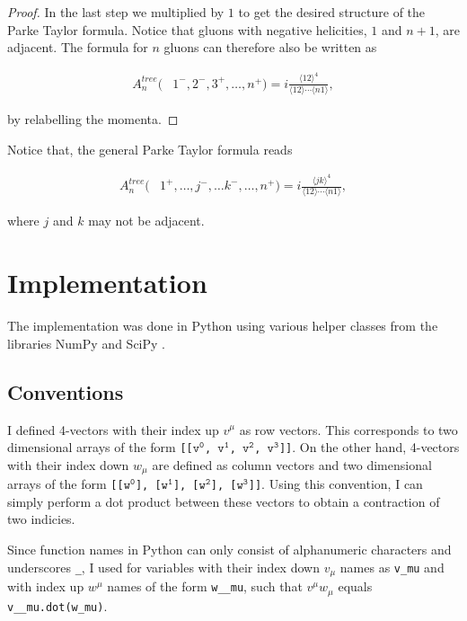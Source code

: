 \documentclass{article}
\theoremstyle{definition}
\def\code#1{\texttt{#1}}
\numberwithin{equation}{section}
\begin{document}
\begin{proof}
In the last step we multiplied by $1$ to get the desired structure of the Parke Taylor formula. Notice that gluons with negative helicities, $1$ and $n+1$, are adjacent. The formula for $n$ gluons can therefore also be written as

\begin{align}
    A_n^{tree}(&1^{-}, 2^{-}, 3^{+}, \dots , n^{+}) = i \frac{ \langle 12 \rangle^4 }{ \langle 12 \rangle \cdots \langle n1 \rangle },
\end{align}

by relabelling the momenta.

\end{proof}

Notice that, the general Parke Taylor formula reads

\begin{align}
    A_n^{tree}(&1^{+}, \dots, j^{-}, \dots k^{-}, \dots, n^{+}) = i \frac{ \langle jk \rangle^4 }{ \langle 12 \rangle \cdots \langle n1 \rangle },
\end{align}

where $j$ and $k$ may not be adjacent.  

\section{Implementation}

The implementation was done in Python using various helper classes from the libraries NumPy \cite{numpy} and SciPy \cite{scipy}.

\subsection{Conventions}

I defined 4-vectors with their index up $v^{\mu}$ as row vectors. This corresponds to two dimensional arrays of the form \code{[[$\code{v}^{\code{0}}$, $\code{v}^{\code{1}}$, $\code{v}^{\code{2}}$, $\code{v}^{\code{3}}$]]}. On the other hand, 4-vectors with their index down $w_{\mu}$ are defined as column vectors and two dimensional arrays of the form \code{[[$\code{w}^{\code{0}}$], [$\code{w}^{\code{1}}$], [$\code{w}^{\code{2}}$], [$\code{w}^{\code{3}}$]]}. Using this convention, I can simply perform a dot product between these vectors to obtain a contraction of two indicies.

Since function names in Python can only consist of alphanumeric characters and underscores \code{\_}, I used for variables with their index down $v_{\mu}$ names as \code{v\_mu} and with index up $w^{\mu}$ names of the form \code{w\_\_mu}, such that $v^{\mu} w_{\mu}$ equals \code{v\_\_mu.dot(w\_mu)}.
\end{document}
